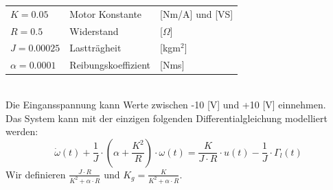 \begin{aufgabe}
\begin{tabular}{@{}lll}
        $K = 0.05$          & Motor Konstante                   & [Nm/A] und [VS] \\
        $R = 0.5$           & Widerstand                        & [$\Omega$] \\
        $J = 0.00025$       & Lastträgheit                      & [kgm$^2$] \\
        $\alpha = 0.0001$   & Reibungskoeffizient               & [Nms] \\
    \end{tabular}
    \\
    Die Eingansspannung kann Werte zwischen -10 [V] und +10 [V] einnehmen. \\
    Das System kann mit der einzigen folgenden Differentialgleichung modelliert werden:
    \[ \dot{\omega}(t) 
        + \frac{1}{J} \cdot \left(\alpha + \frac{K^2}{R}\right) \cdot \omega(t) 
        = \frac{K}{J \cdot R} \cdot u(t) - \frac{1}{J} \cdot \Gamma_l(t)
    \]
    Wir definieren $\frac{J \cdot R}{K^2 + \alpha \cdot R}$ und 
    $K_g = \frac{K}{K^2 + \alpha \cdot R}$. 
\end{aufgabe}
